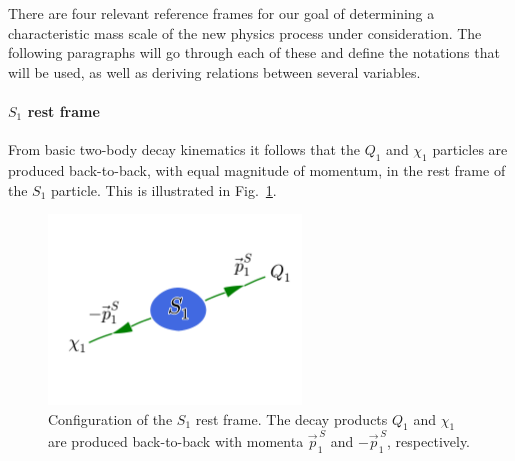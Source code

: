 There are four relevant reference frames for our goal of determining a characteristic mass scale
of the new physics process under consideration. The following paragraphs will go through each of
these and define the notations that will be used, as well as deriving relations between several
variables. 

\paragraph{$S_1$ rest frame} 
From basic two-body decay kinematics it follows that the $Q_1$ and $\chi_1$ particles are produced
back-to-back, with equal magnitude of momentum, in the rest frame of the $S_1$ particle. This is
illustrated in Fig.~\ref{fig:razor_S1_rest_frame}. 

\begin{figure}[htpb]
  \centering
  \includegraphics[width=0.6\textwidth,clip=true,trim=0 4cm 0
3cm]{figures/razor_variables/rest_frame}
  \caption{Configuration of the $S_1$ rest frame. The decay products $Q_1$ and $\chi_1$ are
produced back-to-back with momenta $\vec{p}^{\,S}_1$ and $-\vec{p}^{\,S}_1$, respectively. 
\label{fig:razor_S1_rest_frame}}
\end{figure}


